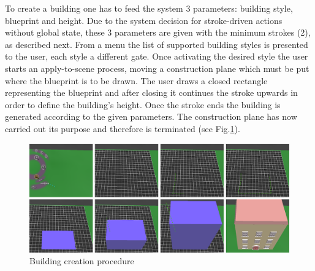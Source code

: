 To create a building one has to feed the system 3 parameters: building style, blueprint and height.
Due to the system decision for stroke-driven actions without global state, these 3 parameters are given with the
minimum strokes (2), as described next.
From a menu the list of supported building styles is presented to the user, each style a different gate.
Once activating the desired style the user starts an apply-to-scene process, moving a construction plane which must
be put where the blueprint is to be drawn.
The user draws a closed rectangle representing the blueprint and after closing it continues
the stroke upwards in order to define the building's height.
Once the stroke ends the building is generated according to the given parameters.
The construction plane has now carried out its purpose and therefore is terminated (see Fig.\ref{fig:building}).

\begin{figure}[ht]
	\centering
		\includegraphics[scale=0.4]{gfx/building.png}
	\caption{Building creation procedure}
	\label{fig:building}
\end{figure}
